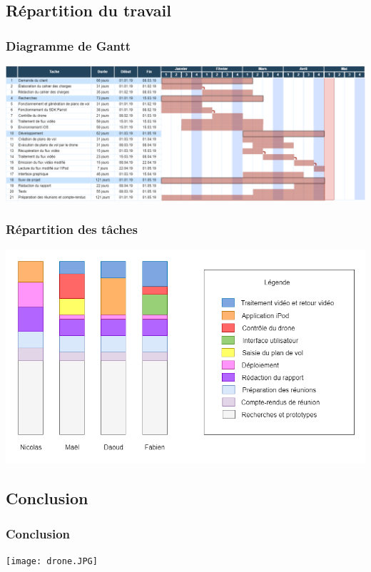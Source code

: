 \documentclass{beamer}
\begin{document}
	
	\begin{frame}
		\section{Répartition du travail}
		\begin{center}
		\frametitle{Diagramme de Gantt}
        \includegraphics[scale=0.26]{gantt.png}
		\end{center}
	\end{frame}

	
	\begin{frame}
		\begin{center}
		\frametitle{Répartition des tâches}
        \includegraphics[scale=0.3]{repartition_taches.png}
		\end{center}
	\end{frame}

	
	\begin{frame}
	    \section{Conclusion}
		\begin{center}
		\frametitle{Conclusion}
		\texttt{[image: drone.JPG]}
		\end{center}
	\end{frame}



	
\end{document}
